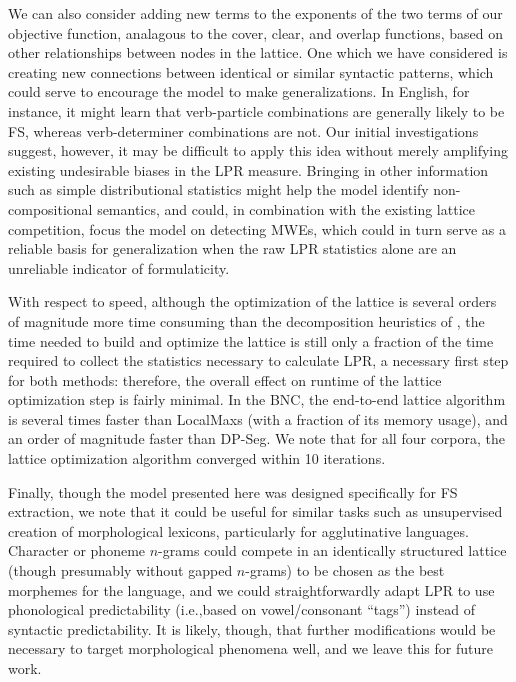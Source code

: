 \documentclass[11pt,letterpaper]{article}
\makeatletter
\def \ie {i.e.,\@ }
\makeatother
\begin{document}
We can also consider adding new terms to the exponents of the two terms of our objective function, analagous to the cover, clear, and overlap functions, based on other relationships between nodes in the lattice. One which we have considered is creating new connections between identical or similar syntactic patterns, which could serve to encourage the model to make generalizations. In English, for instance, it might learn that verb-particle combinations are generally likely to be FS, whereas verb-determiner combinations are not. Our initial investigations suggest, however, it may be difficult to apply this idea without merely amplifying existing undesirable biases in the LPR measure. Bringing in other information such as simple distributional statistics might help the model identify non-compositional semantics, and could, in combination with the existing lattice competition, focus the model on detecting MWEs, which could in turn serve as a reliable basis for generalization when the raw LPR statistics alone are an unreliable indicator of formulaticity.

With respect to speed, although the optimization of the lattice is several orders of magnitude more time consuming than the decomposition heuristics of , the time needed to build and optimize the lattice is still only a fraction of the time required to collect the statistics necessary to calculate LPR, a necessary first step for both methods: therefore, the overall effect on runtime of the lattice optimization step is fairly minimal. In the BNC, the end-to-end lattice algorithm is several times faster than LocalMaxs (with a fraction of its memory usage), and an order of magnitude faster than DP-Seg. We note that for all four corpora, the lattice optimization algorithm converged within 10 iterations.



Finally, though the model presented here was designed specifically for FS extraction, we note that it could be useful for similar tasks such as unsupervised creation of morphological lexicons, particularly for agglutinative languages. Character or phoneme $n$-grams could compete in an identically structured lattice (though presumably without gapped $n$-grams) to be chosen as the best morphemes for the language, and we could straightforwardly adapt LPR to use phonological predictability (\ie based on vowel/consonant ``tags'') instead of syntactic predictability. It is likely, though, that further modifications would be necessary to target morphological phenomena well, and we leave this for future work.
\end{document}
